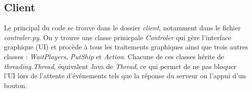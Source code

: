 \documentclass[a4paper, 11pt]{report}
\begin{document}
\subsection{Client}
Le principal du code se trouve dans le dossier \emph{client}, notamment dans le fichier \emph{controler.py}.
On y trouve une classe prinicpale \emph{Controler} qui gère l'interface graphique (UI) et procède à tous les traitements graphiques ainsi que trois autres classes : 
\emph{WaitPlayers}, \emph{PutShip} et \emph{Action}. Chacune de ces classes hérite de \emph{threading.Thread}, équivalent Java de 
\emph{Thread}, ce qui permet de ne pas bloquer l'UI lors de l'attente d'événements tels que la réponse du serveur ou l'appui d'un bouton. 
\end{document}
